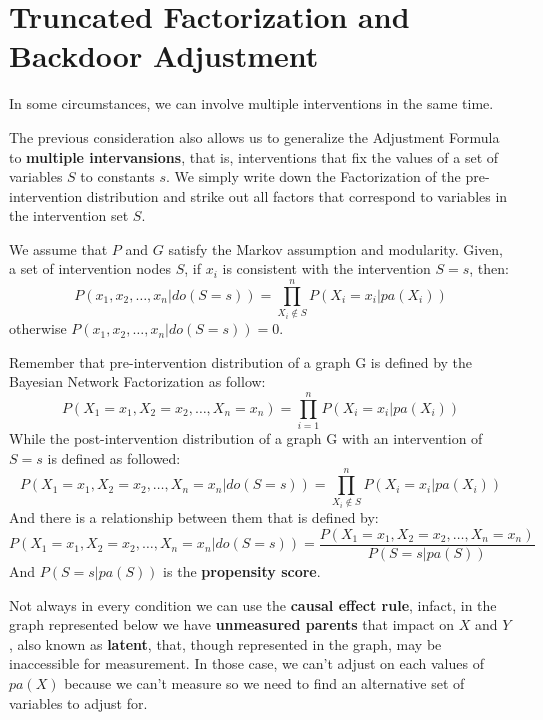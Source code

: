 \section{Truncated Factorization and Backdoor Adjustment}
In some circumstances, we can involve multiple interventions in the same time.

The previous consideration also allows us to generalize the Adjustment Formula to
\textbf{multiple intervansions}, that is, interventions that fix the values of a
set of variables $S$ to constants $s$. We simply write down the Factorization of
the pre-intervention distribution and strike out all factors that correspond to
variables in the intervention set $S$.

\begin{definition}
      We assume that $P$ and $G$ satisfy the Markov assumption and modularity.
      Given, a set of intervention nodes $S$, if $x_i$ is consistent with the
      intervention $S = s$, then:
      \begin{equation}
            P(x_1, x_2, \dots, x_n| do(S = s)) = \prod_{X_i\not \in S}^{n} P(X_i = x_i | pa(X_i))
      \end{equation}
      otherwise $P(x_1, x_2, \dots, x_n| do(S = s)) = 0$.
\end{definition}

\begin{note}
      Remember that pre-intervention distribution of a graph G is defined by the
      Bayesian Network Factorization as follow:
      $$P(X_1 = x_1, X_2=x_2, \dots, X_n=x_n) = \prod_{i=1}^{n} P(X_i=x_i | pa(X_i))$$
      While the post-intervention distribution of a graph G with an intervention of
      $S=s$ is defined as followed:
      $$P(X_1 = x_1, X_2=x_2, \dots, X_n=x_n | do(S=s)) = \prod_{X_i\not \in S}^{n} P(X_i=x_i | pa(X_i))$$
      And there is a relationship between them that is defined by:
      $$P(X_1 = x_1, X_2=x_2, \dots, X_n=x_n | do(S=s)) = \frac{P(X_1 = x_1, X_2=x_2, \dots, X_n=x_n)}{P(S=s | pa(S))}$$
      And $P(S=s | pa(S))$ is the \textbf{propensity score}.
\end{note}

Not always in every condition we can use the \textbf{causal effect rule}, infact,
in the graph represented below we have \textbf{unmeasured parents} that impact on
$X$ and $Y$, also known as
\textbf{latent}, that, though represented in the graph, may be inaccessible for
measurement. In those case, we can't adjust on each values of $pa(X)$ because we
can't measure so we need to find an alternative set of variables to adjust for.

